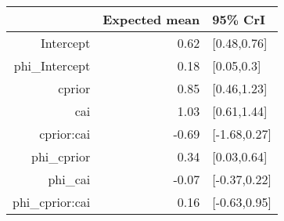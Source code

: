 \begin{tabular}{rrl}
  \hline
 & Expected mean & 95\% CrI \\ 
  \hline
Intercept & 0.62 & [0.48,0.76] \\ 
  phi\_Intercept & 0.18 & [0.05,0.3] \\ 
  cprior & 0.85 & [0.46,1.23] \\ 
  cai & 1.03 & [0.61,1.44] \\ 
  cprior:cai & -0.69 & [-1.68,0.27] \\ 
  phi\_cprior & 0.34 & [0.03,0.64] \\ 
  phi\_cai & -0.07 & [-0.37,0.22] \\ 
  phi\_cprior:cai & 0.16 & [-0.63,0.95] \\ 
   \hline
\end{tabular}

